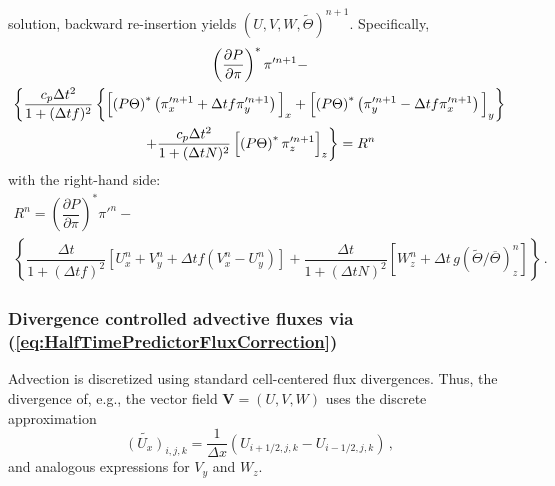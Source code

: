 \documentclass{ametsoc}
\theoremstyle{definition}
\newcommand{\eq}[1]{(\ref{#1})}
\newcommand{\vect}[1]{{\mathbf{#1}}}
\newcommand{\vV}{\vect{V}}
\newcommand{\half}{1/2}
\newcommand{\dt}{\Delta t}
\newcommand{\Thetabar}{\overline{\Theta}}
\newcommand{\Thetatilde}{{\widetilde \Theta}}
\newcommand{\dx}{{\Delta x}}
\begin{document}
solution, backward re-insertion yields $(U, V, W, \Thetatilde)^{n+1}$. 
Specifically, 
%
 \begin{multline}\label{eq:helmholtz}
 \left(\dfrac{\partial P}{\partial\pi}\right)^*\pi'^{n+1} - \\
\left\{
    \dfrac{c_p\dt^2}{1+(\dt f)^2} 
    \left\{
      \left[
        \left(P\Theta\right)^*
          \left(\pi'^{n+1}_x+\dt f\pi'^{n+1}_y
          \right)
        \rule{0pt}{12pt}\right]_x
       +\left[
          \left(P\Theta\right)^*
            \left(\pi'^{n+1}_y-\dt f\pi'^{n+1}_x
            \right)
         \rule{0pt}{12pt}\right]_y
      \right\}
    \right.\\
    \left.
  + \dfrac{c_p\dt^2}{1+(\dt N)^2}
      \left[\left(P\Theta\right)^*\pi'^{n+1}_z
      \rule{0pt}{12pt}\right]_z
    \right\}
  = R^n
 \end{multline}
%
with the right-hand side:
%
\begin{multline}\label{eq:helmholtz_rhs}
R^n=\left(\dfrac{\partial P}{\partial\pi}\right)^*\pi'^n-\\
\left\{\dfrac{\dt}{1+(\dt f)^2}\left[U^n_x+V^n_y+\dt f(V^n_x-U^n_y)\right]
+\dfrac{\dt}{1+(\dt N)^2}\left[W^n_z+\dt\, g\left(\Thetatilde/\Thetabar\right)^n_z\right]\right\} \,.
\end{multline}

\subsubsection{Divergence controlled advective fluxes via 
\eq{eq:HalfTimePredictorFluxCorrection}}
\label{sssec:DivControlledAdvectiveFluxes}

Advection is discretized using standard cell-centered flux divergences.  
Thus, the divergence of, e.g., the vector field $\vV = (U,V,W)$ uses the 
discrete approximation
%
\begin{equation}
\widetilde{\left(U_x\right)}_{i,j,k} 
=
\frac{1}{\dx} \left(U_{i+\half,j,k} - U_{i-\half,j,k}\right)\,,
\end{equation}
%
and analogous expressions for $V_y$ and $W_z$.
\end{document}
